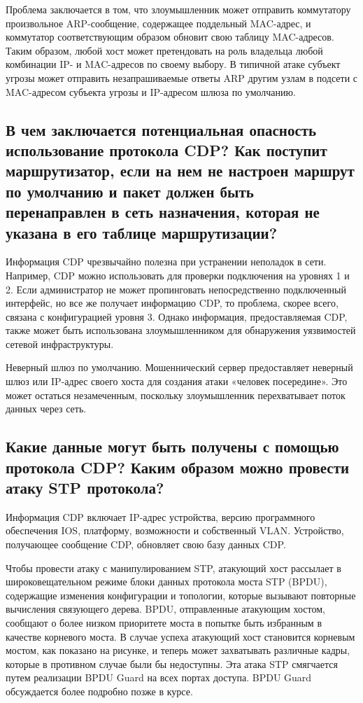 Проблема заключается в том, что злоумышленник может отправить коммутатору произвольное ARP-сообщение, содержащее поддельный MAC-адрес, и коммутатор соответствующим образом обновит свою таблицу MAC-адресов. Таким образом, любой хост может претендовать на роль владельца любой комбинации IP- и MAC-адресов по своему выбору. В типичной атаке субъект угрозы может отправить незапрашиваемые ответы ARP другим узлам в подсети с MAC-адресом субъекта угрозы и IP-адресом шлюза по умолчанию.


\subsection{В чем заключается потенциальная опасность использование протокола CDP? Как поступит маршрутизатор, если на нем не настроен маршрут по умолчанию и пакет должен быть перенаправлен в сеть назначения, которая не указана в его таблице маршрутизации?}

Информация CDP чрезвычайно полезна при устранении неполадок в сети. Например, CDP можно использовать для проверки подключения на уровнях 1 и 2. Если администратор не может пропинговать непосредственно подключенный интерфейс, но все же получает информацию CDP, то проблема, скорее всего, связана с конфигурацией уровня 3.
Однако информация, предоставляемая CDP, также может быть использована злоумышленником для обнаружения уязвимостей сетевой инфраструктуры.

Неверный шлюз по умолчанию. Мошеннический сервер предоставляет неверный шлюз или IP-адрес своего хоста для создания атаки «человек посередине». Это может остаться незамеченным, поскольку злоумышленник перехватывает поток данных через сеть.


\subsection{Какие данные могут быть получены с помощью протокола CDP? Каким образом можно провести атаку STP протокола?}

Информация CDP включает IP-адрес устройства, версию программного обеспечения IOS, платформу, возможности и собственный VLAN. Устройство, получающее сообщение CDP, обновляет свою базу данных CDP.

Чтобы провести атаку с манипулированием STP, атакующий хост рассылает в широковещательном режиме блоки данных протокола моста STP (BPDU), содержащие изменения конфигурации и топологии, которые вызывают повторные вычисления связующего дерева. BPDU, отправленные атакующим хостом, сообщают о более низком приоритете моста в попытке быть избранным в качестве корневого моста.
В случае успеха атакующий хост становится корневым мостом, как показано на рисунке, и теперь может захватывать различные кадры, которые в противном случае были бы недоступны.
Эта атака STP смягчается путем реализации BPDU Guard на всех портах доступа. BPDU Guard обсуждается более подробно позже в курсе.

